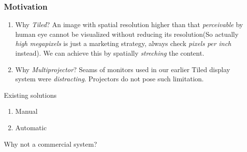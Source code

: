\documentclass{beamer}
\begin{document}
\begin{frame}
\frametitle{Motivation}
\begin{enumerate}
\item Why \textit{Tiled}?\newline
An image with spatial resolution higher than that \textit{perceivable} by human eye cannot be visualized without reducing its resolution(So actually \textit{high megapixels} is just a marketing strategy, always check \textit{pixels per inch} instead). We can achieve this by spatially \textit{streching} the content.
\item Why \textit{Multiprojector}?\newline
Seams of monitors used in our earlier Tiled display system were \textit{distracting}. Projectors do not pose such limitation.
\end{enumerate}
\end{frame}


\begin{frame}{Existing solutions}
\begin{enumerate}
\item Manual 
\item Automatic
\end{enumerate}
\end{frame}


\begin{frame}{Why not a commercial system?}
\end{frame}

\end{document}
